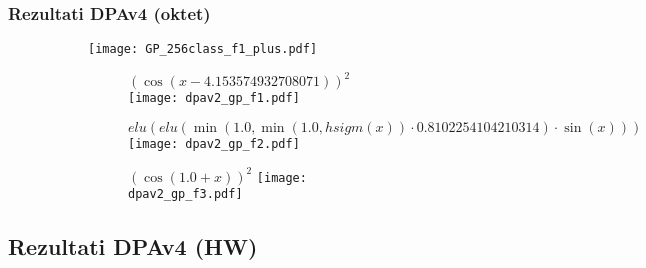 \documentclass{beamer}
\begin{document}
\begin{frame}
\frametitle{Rezultati DPAv4 (oktet)}

\begin{figure}
\centering
\begin{subfigure}{.49\textwidth}
  \centering
  \texttt{[image: GP\_256class\_f1\_plus.pdf]}
\end{subfigure}
\begin{subfigure}{.49\textwidth}
  \centering
  \begin{subfigure}{\linewidth}
    \centering
    \tiny $(\cos(x-4.153574932708071))^2$
    \texttt{[image: dpav2\_gp\_f1.pdf]}
  \end{subfigure}
  \begin{subfigure}{\linewidth}
    \centering
    \vspace{2mm}
    \tiny $elu (elu (\min (1.0,\min (1.0,hsigm (x)) \cdot 0.8102254104210314) \cdot \sin (x)))$
    \texttt{[image: dpav2\_gp\_f2.pdf]}
  \end{subfigure}
  \begin{subfigure}{\linewidth}
    \centering
    \vspace{2mm}
    \tiny $(\cos(1.0 + x))^2$
    \texttt{[image: dpav2\_gp\_f3.pdf]}
  \end{subfigure}
\end{subfigure}
\end{figure}

\end{frame}

\subsection{Rezultati DPAv4 (HW)}
\end{document}
